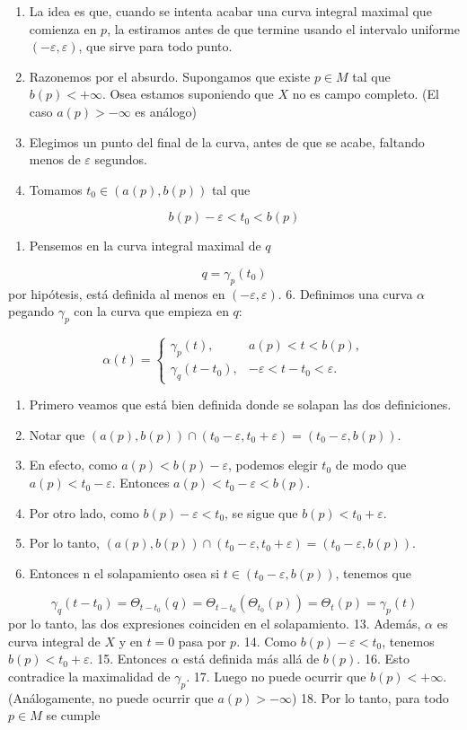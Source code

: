 \begin{bookproof}{}
\begin{enumerate}
\item La idea es que, cuando se intenta acabar una curva integral maximal que comienza en $p$, la estiramos antes de que termine usando el intervalo uniforme $(-\varepsilon,\varepsilon)$, que sirve para todo punto.
\item Razonemos por el absurdo. Supongamos que existe $p\in M$ tal que $b(p)<+\infty$. Osea estamos suponiendo que $X$ no es campo completo. (El caso $a(p)>-\infty$ es análogo)
\item Elegimos un punto del final de la curva, antes de que se acabe, faltando menos de $\varepsilon$ segundos.
\item Tomamos $t_0\in(a(p),b(p))$ tal que
\end{enumerate}
\[
b(p)-\varepsilon<t_0<b(p)
\]
\begin{enumerate}[start=5]
\item Pensemos en la curva integral maximal de $q$
\end{enumerate}
\[
q=\gamma_p(t_0)
\]
por hipótesis, está definida al menos en $(-\varepsilon,\varepsilon)$. 6. Definimos una curva $\alpha$ pegando $\gamma_p$ con la curva que empieza en $q$:

\[
\alpha(t)=\begin{cases}\gamma_p(t),&a(p)<t<b(p),\\\gamma_q(t-t_0),&-\varepsilon<t-t_0<\varepsilon.\end{cases}
\]
\begin{enumerate}[start=7]
\item Primero veamos que está bien definida donde se solapan las dos definiciones.
\item Notar que $(a(p),b(p))\cap(t_0-\varepsilon,t_0+\varepsilon)=(t_0-\varepsilon,b(p))$.
\item En efecto, como $a(p)<b(p)-\varepsilon$, podemos elegir $t_0$ de modo que $a(p)<t_0-\varepsilon$. Entonces $a(p)<t_0-\varepsilon<b(p)$.
\item Por otro lado, como $b(p)-\varepsilon<t_0$, se sigue que $b(p)<t_0+\varepsilon$.
\item Por lo tanto, $(a(p),b(p))\cap(t_0-\varepsilon,t_0+\varepsilon)=(t_0-\varepsilon,b(p))$.
\item Entonces n el solapamiento osea si $t\in(t_0-\varepsilon,b(p))$, tenemos que
\end{enumerate}
\[
\gamma_q(t-t_0)=\Theta_{t-t_0}(q)=\Theta_{t-t_0}(\Theta_{t_0}(p))=\Theta_t(p)=\gamma_p(t)
\]
por lo tanto, las dos expresiones coinciden en el solapamiento. 13. Además, $\alpha$ es curva integral de $X$ y en $t=0$ pasa por $p$. 14. Como $b(p)-\varepsilon<t_0$, tenemos $b(p)<t_0+\varepsilon$. 15. Entonces $\alpha$ está definida más allá de $b(p)$. 16. Esto contradice la maximalidad de $\gamma_p$. 17. Luego no puede ocurrir que $b(p)<+\infty$. (Análogamente, no puede ocurrir que $a(p)>-\infty$) 18. Por lo tanto, para todo $p\in M$ se cumple


\end{bookproof}
